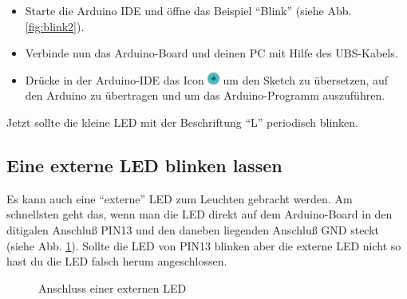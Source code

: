 
\begin{itemize}
  \item[1.] Starte die Arduino IDE und öffne das Beispiel ``Blink'' (siehe Abb. \ref{fig:blink2}).
  \item[2.] Verbinde nun das Arduino-Board und deinen PC mit Hilfe des UBS-Kabels.
  \item[3.] Drücke in der Arduino-IDE das Icon \includegraphics[width=0.03\textwidth]{Kapitel1/Bilder/play} um den Sketch zu übersetzen, auf den Arduino zu übertragen und um das Arduino-Programm auszuführen.
\end{itemize}

Jetzt sollte die kleine LED mit der Beschriftung ``L'' periodisch blinken.

\subsection{Eine externe LED blinken lassen}

Es kann auch eine ``externe'' LED zum Leuchten gebracht werden. Am schnellsten geht das, wenn man die LED direkt auf dem Arduino-Board in den ditigalen  Anschluß PIN13 und den daneben liegenden Anschluß GND steckt (siehe Abb. \ref{fig:arduino_blink_schaltung}). Sollte die LED von PIN13 blinken aber die externe LED nicht so hast du die LED falsch herum angeschlossen. 



\begin{figure}[h]
  \begin{center}
    \caption{Anschluss einer externen LED}
    \label{fig:arduino_blink_schaltung}
  \end{center}
\end{figure}


